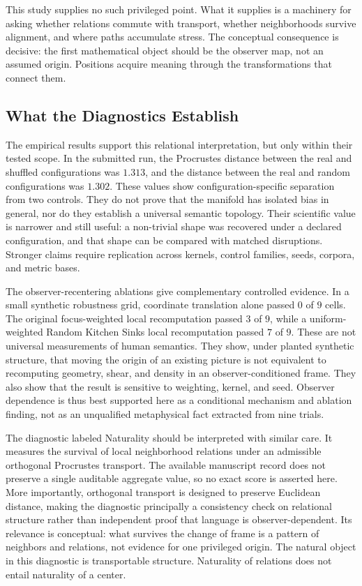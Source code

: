 This study supplies no such privileged point. What it supplies is a machinery for asking whether relations commute with transport, whether neighborhoods survive alignment, and where paths accumulate stress. The conceptual consequence is decisive: the first mathematical object should be the observer map, not an assumed origin. Positions acquire meaning through the transformations that connect them.

\subsection{What the Diagnostics Establish}

The empirical results support this relational interpretation, but only within their tested scope. In the submitted run, the Procrustes distance between the real and shuffled configurations was $1.313$, and the distance between the real and random configurations was $1.302$. These values show configuration-specific separation from two controls. They do not prove that the manifold has isolated bias in general, nor do they establish a universal semantic topology. Their scientific value is narrower and still useful: a non-trivial shape was recovered under a declared configuration, and that shape can be compared with matched disruptions. Stronger claims require replication across kernels, control families, seeds, corpora, and metric bases.

The observer-recentering ablations give complementary controlled evidence. In a small synthetic robustness grid, coordinate translation alone passed $0$ of $9$ cells. The original focus-weighted local recomputation passed $3$ of $9$, while a uniform-weighted Random Kitchen Sinks local recomputation passed $7$ of $9$. These are not universal measurements of human semantics. They show, under planted synthetic structure, that moving the origin of an existing picture is not equivalent to recomputing geometry, shear, and density in an observer-conditioned frame. They also show that the result is sensitive to weighting, kernel, and seed. Observer dependence is thus best supported here as a conditional mechanism and ablation finding, not as an unqualified metaphysical fact extracted from nine trials.

The diagnostic labeled Naturality should be interpreted with similar care. It measures the survival of local neighborhood relations under an admissible orthogonal Procrustes transport. The available manuscript record does not preserve a single auditable aggregate value, so no exact score is asserted here. More importantly, orthogonal transport is designed to preserve Euclidean distance, making the diagnostic principally a consistency check on relational structure rather than independent proof that language is observer-dependent. Its relevance is conceptual: what survives the change of frame is a pattern of neighbors and relations, not evidence for one privileged origin. The natural object in this diagnostic is transportable structure. Naturality of relations does not entail naturality of a center.

